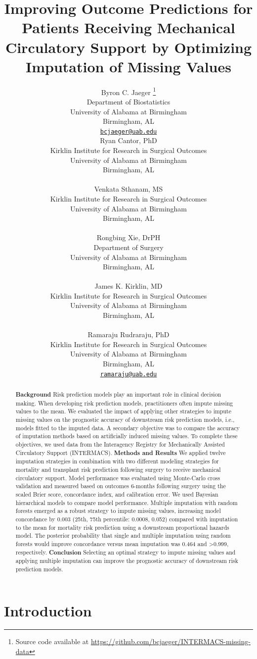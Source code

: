 \documentclass{article}
\title{Improving Outcome Predictions for Patients Receiving Mechanical
Circulatory Support by Optimizing Imputation of Missing Values}
\author{
    Byron C. Jaeger
    \thanks{Source code available at
\url{https://github.com/bcjaeger/INTERMACS-missing-data}}
   \\
    Department of Biostatistics \\
    University of Alabama at Birmingham \\
  Birmingham, AL \\
  \texttt{\href{mailto:bcjaeger@uab.edu}{\nolinkurl{bcjaeger@uab.edu}}} \\
   \And
    Ryan Cantor, PhD
   \\
    Kirklin Institute for Research in Surgical Outcomes \\
    University of Alabama at Birmingham \\
  Birmingham, AL \\
  \texttt{} \\
   \And
    Venkata Sthanam, MS
   \\
    Kirklin Institute for Research in Surgical Outcomes \\
    University of Alabama at Birmingham \\
  Birmingham, AL \\
  \texttt{} \\
   \And
    Rongbing Xie, DrPH
   \\
    Department of Surgery \\
    University of Alabama at Birmingham \\
  Birmingham, AL \\
  \texttt{} \\
   \And
    James K. Kirklin, MD
   \\
    Kirklin Institute for Research in Surgical Outcomes \\
    University of Alabama at Birmingham \\
  Birmingham, AL \\
  \texttt{} \\
   \And
    Ramaraju Rudraraju, PhD
   \\
    Kirklin Institute for Research in Surgical Outcomes \\
    University of Alabama at Birmingham \\
  Birmingham, AL \\
  \texttt{\href{mailto:ramaraju@uab.edu}{\nolinkurl{ramaraju@uab.edu}}} \\
  }
\begin{document}
\maketitle

\def\tightlist{}


\begin{abstract}
\textbf{Background} Risk prediction models play an important role in
clinical decision making. When developing risk prediction models,
practitioners often impute missing values to the mean. We evaluated the
impact of applying other strategies to impute missing values on the
prognostic accuracy of downstream risk prediction models, i.e., models
fitted to the imputed data. A secondary objective was to compare the
accuracy of imputation methods based on artificially induced missing
values. To complete these objectives, we used data from the Interagency
Registry for Mechanically Assisted Circulatory Support (INTERMACS).
\newline\textbf{Methods and Results} We applied twelve imputation
strategies in combination with two different modeling strategies for
mortality and transplant risk prediction following surgery to receive
mechanical circulatory support. Model performance was evaluated using
Monte-Carlo cross validation and measured based on outcomes 6-months
following surgery using the scaled Brier score, concordance index, and
calibration error. We used Bayesian hierarchical models to compare model
performance. Multiple imputation with random forests emerged as a robust
strategy to impute missing values, increasing model concordance by 0.003
(25th, 75th percentile: 0.0008, 0.052) compared with imputation to the
mean for mortality risk prediction using a downstream proportional
hazards model. The posterior probability that single and multiple
imputation using random forests would improve concordance versus mean
imputation was 0.464 and \textgreater0.999, respectively.
\newline\textbf{Conclusion} Selecting an optimal strategy to impute
missing values and applying multiple imputation can improve the
prognostic accuracy of downstream risk prediction models.
\end{abstract}


\hypertarget{introduction}{%
\section{Introduction}\label{introduction}}
\end{document}
